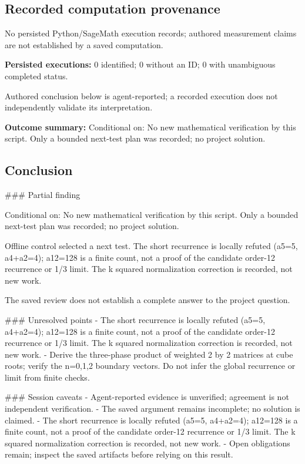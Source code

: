 \documentclass[11pt]{article}
\begin{document}
\subsection{Recorded computation provenance}
No persisted Python/SageMath execution records; authored measurement claims are not established by a saved computation.\par
\textbf{Persisted executions:} 0 identified; 0 without an ID; 0 with unambiguous completed status.\par
Authored conclusion below is agent-reported; a recorded execution does not independently validate its interpretation.\par
\textbf{Outcome summary:} Conditional on: No new mathematical verification by this script. Only a bounded next-test plan was recorded; no project solution.\par
\subsection{Conclusion}
\#\#\# Partial finding

Conditional on: No new mathematical verification by this script. Only a bounded next-test plan was recorded; no project solution.

Offline control selected a next test. The short recurrence is locally refuted (a5=5, a4+a2=4); a12=128 is a finite count, not a proof of the candidate order-12 recurrence or 1/3 limit. The k squared normalization correction is recorded, not new work.

The saved review does not establish a complete answer to the project question.

\#\#\# Unresolved points
- The short recurrence is locally refuted (a5=5, a4+a2=4); a12=128 is a finite count, not a proof of the candidate order-12 recurrence or 1/3 limit. The k squared normalization correction is recorded, not new work.
- Derive the three-phase product of weighted 2 by 2 matrices at cube roots; verify the n=0,1,2 boundary vectors. Do not infer the global recurrence or limit from finite checks.

\#\#\# Session caveats
- Agent-reported evidence is unverified; agreement is not independent verification.
- The saved argument remains incomplete; no solution is claimed.
- The short recurrence is locally refuted (a5=5, a4+a2=4); a12=128 is a finite count, not a proof of the candidate order-12 recurrence or 1/3 limit. The k squared normalization correction is recorded, not new work.
- Open obligations remain; inspect the saved artifacts before relying on this result.
\end{document}
